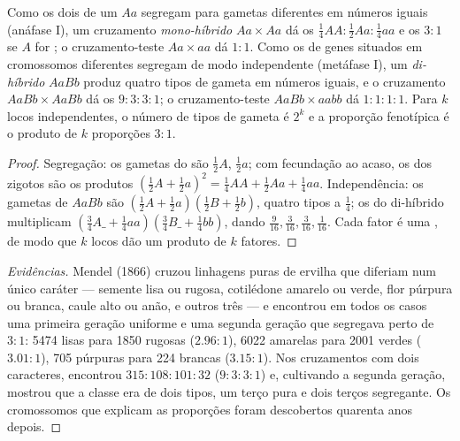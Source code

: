 \begin{theorem}\label{thm:b2:meiosis-heredity:mendel}
Como os dois  de um  $Aa$ segregam para gametas
diferentes em números iguais (anáfase I), um cruzamento
\emph{mono-híbrido} $Aa \times Aa$ dá os 
$\tfrac14 AA : \tfrac12 Aa :
\tfrac14 aa$ e os  $3 : 1$ se $A$ for ; o
cruzamento-teste $Aa \times aa$ dá $1 : 1$. Como os  de genes
situados em cromossomos diferentes segregam de modo independente
(metáfase I), um \emph{di-híbrido} $AaBb$ produz quatro tipos de
gameta em números iguais, e o cruzamento $AaBb \times AaBb$ dá os
 $9 : 3 : 3 : 1$; o cruzamento-teste
$AaBb \times aabb$ dá $1 : 1 : 1 : 1$. Para $k$ locos 
independentes, o número de tipos de gameta é $2^k$ e a proporção
fenotípica é o produto de $k$ proporções $3 : 1$.
\end{theorem}
\begin{proof}
Segregação: os gametas do  são $\tfrac12 A$,
$\tfrac12 a$; com fecundação ao acaso, os  dos zigotos são os
produtos $(\tfrac12 A + \tfrac12 a)^2 = \tfrac14 AA + \tfrac12 Aa +
\tfrac14 aa$. Independência: os gametas de $AaBb$ são $(\tfrac12 A
+ \tfrac12 a)(\tfrac12 B + \tfrac12 b)$, quatro tipos a $\tfrac14$;
os  do di-híbrido multiplicam $(\tfrac34 A\_ + \tfrac14 aa)
(\tfrac34 B\_ + \tfrac14 bb)$, dando $\tfrac{9}{16}, \tfrac{3}{16},
\tfrac{3}{16}, \tfrac{1}{16}$. Cada fator é uma , de modo que $k$ locos dão um produto de $k$ fatores.
\end{proof}
\begin{proof}[Evidências]
Mendel (1866) cruzou linhagens puras de ervilha que diferiam num único
caráter --- semente lisa ou rugosa, cotilédone amarelo ou verde, flor
púrpura ou branca, caule alto ou anão, e outros três --- e encontrou
em todos os casos uma primeira geração uniforme e uma segunda geração
que segregava perto de $3 : 1$: 5474 lisas para 1850 rugosas ($2.96 :
1$), 6022 amarelas para 2001 verdes ($3.01 : 1$), 705 púrpuras para 224
brancas ($3.15 : 1$). Nos cruzamentos com dois caracteres, encontrou
$315 : 108 : 101 :
32$ ($9 : 3 : 3 : 1$) e, cultivando a segunda geração, mostrou que a
classe  era de dois tipos, um terço pura e dois terços
segregante. Os cromossomos que explicam as proporções foram
descobertos quarenta anos depois.
\end{proof}

